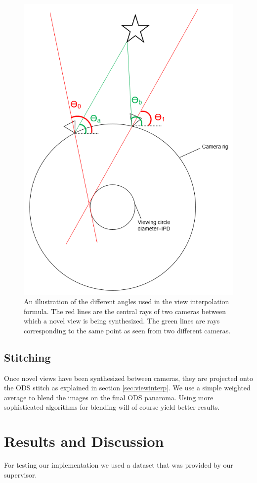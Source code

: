 \documentclass[10pt,twocolumn,letterpaper]{article}
\begin{document}
\begin{figure}[t]
\begin{center}
   \includegraphics[width=0.7\linewidth]{pictures/interpolation.PNG}
\end{center}
   \caption{An illustration of the different angles used in the view interpolation formula. The red lines are the central rays of two cameras between which a novel view is being synthesized. The green lines are rays corresponding to the same point as seen from two different cameras.}
\label{fig:interpolation}
\end{figure}

\subsection{Stitching}
Once novel views have been synthesized between cameras, they are projected onto the ODS stitch as explained in section \ref{sec:viewinterp}. We use a simple weighted average to blend the images on the final ODS panaroma. Using more sophisticated algorithms for blending will of course yield better results. 
\section{Results and Discussion}
\label{resultsdis}
For testing our implementation we used a dataset that was provided by our supervisor. 
\end{document}
